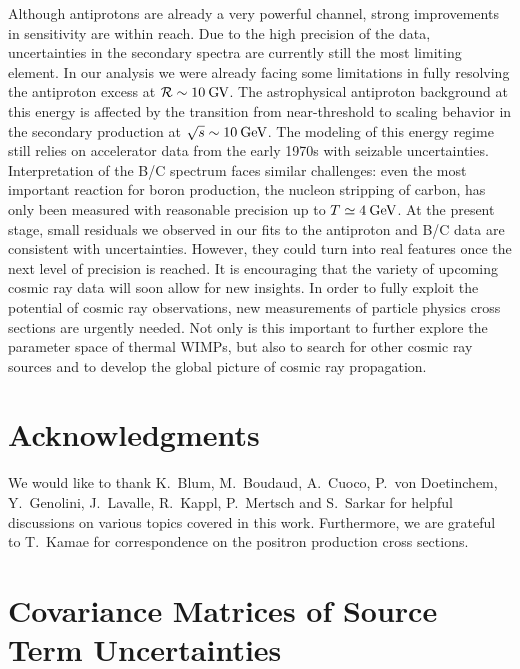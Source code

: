 \documentclass[a4paper,11pt]{article}
\newcommand{\eVdist}{\kern-0.06em}
\newcommand{\gev}{\:\text{Ge\eVdist V}}
\newcommand{\gv}{\:\text{G\eVdist V}}
\newcommand{\R}{\mathcal{R}}
\begin{document}
Although antiprotons are already a very powerful channel, strong improvements in sensitivity are within reach. Due to the high precision of the data, uncertainties in the secondary spectra are currently still the most limiting element. In our analysis we were already facing some limitations in fully resolving the antiproton excess at $\R\sim 10\gv$. The astrophysical antiproton background at this energy is affected by the transition from near-threshold to scaling behavior in the secondary production at $\sqrt{s}\sim 10\gev$. The modeling of this energy regime still relies on accelerator data from the early 1970s with seizable uncertainties. 
Interpretation of the B/C spectrum faces similar challenges: even the most important reaction for boron production, the nucleon stripping of carbon, has only been measured with reasonable precision up to $T\simeq 4 \gev$. At the present stage, small residuals we observed in our fits to the antiproton and B/C data are consistent with uncertainties. However, they could turn into real features once the next level of precision is reached. It is encouraging that the variety of upcoming cosmic ray data will soon allow for new insights. In order to fully exploit the potential of cosmic ray observations, new measurements of particle physics cross sections are urgently needed. Not only is this important to further explore the parameter space of thermal WIMPs, but also to search for other cosmic ray sources and to develop the global picture of cosmic ray propagation.

\section*{Acknowledgments}
We would like to thank K.\ Blum, M.\ Boudaud, A.\ Cuoco, P.\ von Doetinchem, Y.\ Genolini, J.\ Lavalle, R.\ Kappl, P.\ Mertsch and S.\ Sarkar for helpful discussions on various topics covered in this work. Furthermore, we are grateful to T.\ Kamae for correspondence on the positron production cross sections. 


\appendix

\section{Covariance Matrices of Source Term Uncertainties}\label{sec:appendix}
\end{document}
